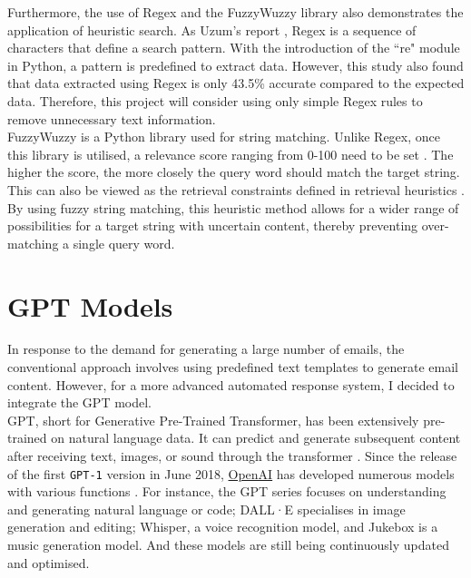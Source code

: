 \documentclass[ oneside,%
                    author={Cassie Qing Tang},
                    degree={BSc},
                     title={An Automated Response System for Disrupting Online Pet Scamming \\ },
                    subtitle={ }]{dissertation}
\begin{document}
Furthermore, the use of Regex and the FuzzyWuzzy library also demonstrates the application of heuristic search. As Uzum's report \cite{uzun_comparison_2018}, Regex is a sequence of characters that define a search pattern. With the introduction of the ``re" module in Python, a pattern is predefined to extract data. However, this study also found that data extracted using Regex is only 43.5\% accurate compared to the expected data. Therefore, this project will consider using only simple Regex rules to remove unnecessary text information. 
\\

FuzzyWuzzy is a Python library used for string matching. Unlike Regex, once this library is utilised, a relevance score ranging from 0-100 need to be set \cite{majumder_fuzzywuzzy_2021}. The higher the score, the more closely the query word should match the target string. This can also be viewed as the retrieval constraints defined in retrieval heuristics \cite{yang_secure_2021}. By using fuzzy string matching, this heuristic method allows for a wider range of possibilities for a target string with uncertain content, thereby preventing over-matching a single query word.


\section{GPT Models}
In response to the demand for generating a large number of emails, the conventional approach involves using predefined text templates to generate email content. However, for a more advanced automated response system, I decided to integrate the GPT model.
\\

GPT, short for Generative Pre-Trained Transformer, has been extensively pre-trained on natural language data. It can predict and generate subsequent content after receiving text, images, or sound through the transformer \cite{3blue1brown_but_2024}. Since the release of the first \texttt{GPT-1} version in June 2018, \href{https://openai.com/}{OpenAI} has developed numerous models with various functions \cite{noauthor_openai_nodate}. For instance, the GPT series focuses on understanding and generating natural language or code; DALL·E specialises in image generation and editing; Whisper, a voice recognition model, and Jukebox is a music generation model. And these models are still being continuously updated and optimised.
\\
\end{document}
